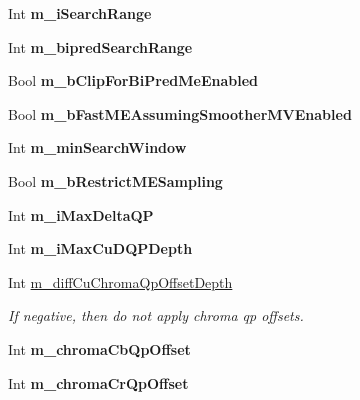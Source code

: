 \begin{DoxyCompactItemize}
Int {\bfseries m\+\_\+i\+Search\+Range}
\item 
\mbox{\label{class_t_enc_cfg_a28a1be3d507ff1e5f1efadaf3dd3723f}} 
Int {\bfseries m\+\_\+bipred\+Search\+Range}
\item 
\mbox{\label{class_t_enc_cfg_a68344f6655a01c99842cd77249dc3c5e}} 
Bool {\bfseries m\+\_\+b\+Clip\+For\+Bi\+Pred\+Me\+Enabled}
\item 
\mbox{\label{class_t_enc_cfg_aebc850658034903d7c52762566d1c36c}} 
Bool {\bfseries m\+\_\+b\+Fast\+M\+E\+Assuming\+Smoother\+M\+V\+Enabled}
\item 
\mbox{\label{class_t_enc_cfg_acf663605b90b33b028dee3310d94cdc5}} 
Int {\bfseries m\+\_\+min\+Search\+Window}
\item 
\mbox{\label{class_t_enc_cfg_a786aa7353aa080eb9d2841a89bdd5053}} 
Bool {\bfseries m\+\_\+b\+Restrict\+M\+E\+Sampling}
\item 
\mbox{\label{class_t_enc_cfg_afda0b2b1a9eb4c1198c8bc9aaff2fa76}} 
Int {\bfseries m\+\_\+i\+Max\+Delta\+QP}
\item 
\mbox{\label{class_t_enc_cfg_a081c0db142b8a107c660e77d5d71606a}} 
Int {\bfseries m\+\_\+i\+Max\+Cu\+D\+Q\+P\+Depth}
\item 
\mbox{\label{class_t_enc_cfg_ae8b9be9cd7ae2778831f10e45041b4ce}} 
Int \hyperlink{class_t_enc_cfg_ae8b9be9cd7ae2778831f10e45041b4ce}{m\+\_\+diff\+Cu\+Chroma\+Qp\+Offset\+Depth}
\begin{DoxyCompactList}\small\item\em If negative, then do not apply chroma qp offsets. \end{DoxyCompactList}\item 
\mbox{\label{class_t_enc_cfg_ac6a3addb5549cd0d216f5b7d9fd55f90}} 
Int {\bfseries m\+\_\+chroma\+Cb\+Qp\+Offset}
\item 
\mbox{\label{class_t_enc_cfg_ac4500a48687422310b1afd1180767a5b}} 
Int {\bfseries m\+\_\+chroma\+Cr\+Qp\+Offset}
\item 

\end{DoxyCompactItemize}
